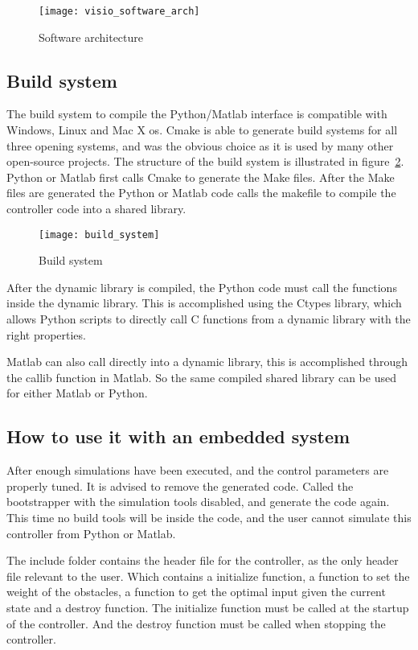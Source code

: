 	\begin{figure}[H]
		\centering
		\texttt{[image: visio\_software\_arch]}
		\caption{Software architecture}
		\label{fig:visio software arch}
	\end{figure}

\subsection{Build system}
The build system to compile the Python/Matlab interface is compatible with Windows, Linux and Mac X os. Cmake is able to generate build systems for all three opening systems, and was the obvious choice as it is used by many other open-source projects. The structure of the build system is illustrated in figure~\ref{fig:build system}. Python or Matlab first calls Cmake to generate the Make files. After the Make files are generated the Python or Matlab code calls the makefile to compile the controller code into a shared library.
\begin{figure}[H]
	\centering
	\texttt{[image: build\_system]}
	\caption{Build system}
	\label{fig:build system}
\end{figure}
After the dynamic library is compiled, the Python code must call the functions inside the dynamic library. This is accomplished using the Ctypes library, which allows Python scripts to directly call C functions from a dynamic library with the right properties.

Matlab can also call directly into a dynamic library, this is accomplished through the callib function in Matlab. So the same compiled shared library can be used for either Matlab or Python.

\subsection{How to use it with an embedded system}
After enough simulations have been executed, and the control parameters are properly tuned. It is advised to remove the generated code. Called the bootstrapper with the simulation tools disabled, and generate the code again. This time no build tools will be inside the code, and the user cannot simulate this controller from Python or Matlab.

The include folder contains the header file for the controller, as the only header file relevant to the user. Which contains a initialize function, a function to set the weight of the obstacles, a function to get the optimal input given the current state and a destroy function. The initialize function must be called at the startup of the controller. And the destroy function must be called when stopping the controller.

